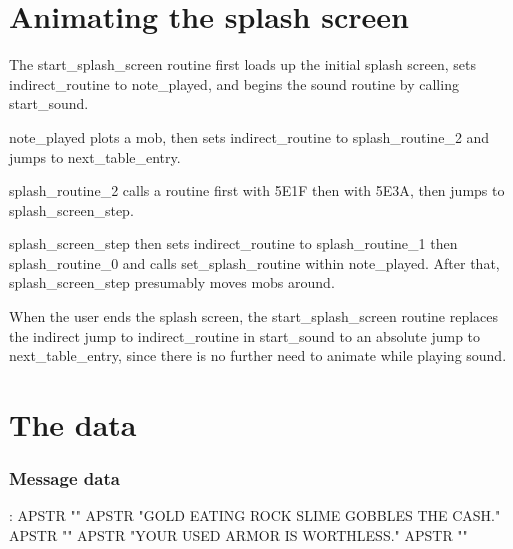 \documentclass[10pt]{report}
\begin{document}
\chapter{Animating the splash screen}

The {\Tt{}start{\_}splash{\_}screen\nwendquote} routine first loads up the initial splash screen,
sets {\Tt{}indirect{\_}routine\nwendquote} to {\Tt{}note{\_}played\nwendquote}, and begins the sound routine by
calling {\Tt{}start{\_}sound\nwendquote}.

{\Tt{}note{\_}played\nwendquote} plots a mob, then sets {\Tt{}indirect{\_}routine\nwendquote} to {\Tt{}splash{\_}routine{\_}2\nwendquote}
and jumps to {\Tt{}next{\_}table{\_}entry\nwendquote}.

{\Tt{}splash{\_}routine{\_}2\nwendquote} calls a routine first with {\Tt{}{\$}5E1F\nwendquote} then with {\Tt{}{\$}5E3A\nwendquote},
then jumps to {\Tt{}splash{\_}screen{\_}step\nwendquote}.

{\Tt{}splash{\_}screen{\_}step\nwendquote} then sets {\Tt{}indirect{\_}routine\nwendquote} to {\Tt{}splash{\_}routine{\_}1\nwendquote}
then {\Tt{}splash{\_}routine{\_}0\nwendquote} and calls {\Tt{}set{\_}splash{\_}routine\nwendquote} within {\Tt{}note{\_}played\nwendquote}.
After that, {\Tt{}splash{\_}screen{\_}step\nwendquote} presumably moves mobs around.


When the user ends the splash screen, the {\Tt{}start{\_}splash{\_}screen\nwendquote} routine
replaces the indirect jump to {\Tt{}indirect{\_}routine\nwendquote} in {\Tt{}start{\_}sound\nwendquote} to an
absolute jump to {\Tt{}next{\_}table{\_}entry\nwendquote}, since there is no further need to
animate while playing sound.


\chapter{The data}
\subsection{Message data}

\nwenddocs{}\endmoddef\nwstartdeflinemarkup\nwenddeflinemarkup
{}:
    APSTR ""
    APSTR "GOLD EATING ROCK SLIME GOBBLES THE CASH."
    APSTR ""
    APSTR "YOUR USED ARMOR IS WORTHLESS."
    APSTR ""
\eatline
{}\nwendcode{}\nwdocspar
\end{document}
